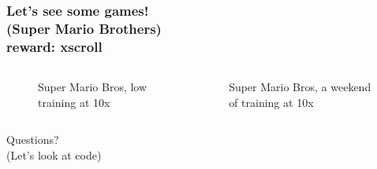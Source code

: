 \documentclass[pdf,11pt]{beamer}
\begin{document}
\begin{frame}
\frametitle{Let's see some games! \\\vspace{-5pt}\large{(Super Mario Brothers)\\\vspace{-20pt}\tiny{reward: xscroll}}}
        \vspace{-10pt}
        \begin{columns}
        \begin{column}{0.49\paperwidth}
        \begin{figure}
        \caption{Super Mario Bros, low training at 10x}
        \end{figure}
        \end{column}
        \begin{column}{0.49\paperwidth}
        \begin{figure}
        \caption{Super Mario Bros, a weekend of training at 10x}
        \end{figure}
        \end{column}
        \end{columns}
\end{frame}

\begin{frame}
\centering
\Huge{Questions?}\\
\normalsize{(Let's look at code)}
\end{frame}
\end{document}
